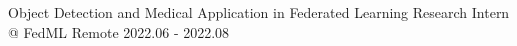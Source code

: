 



\begin{cventries}

\cventry
{Object Detection and Medical Application in Federated Learning} %
{Research Intern @ FedML} %
{Remote} %
{2022.06 - 2022.08} %
{
}
    

\end{cventries}
